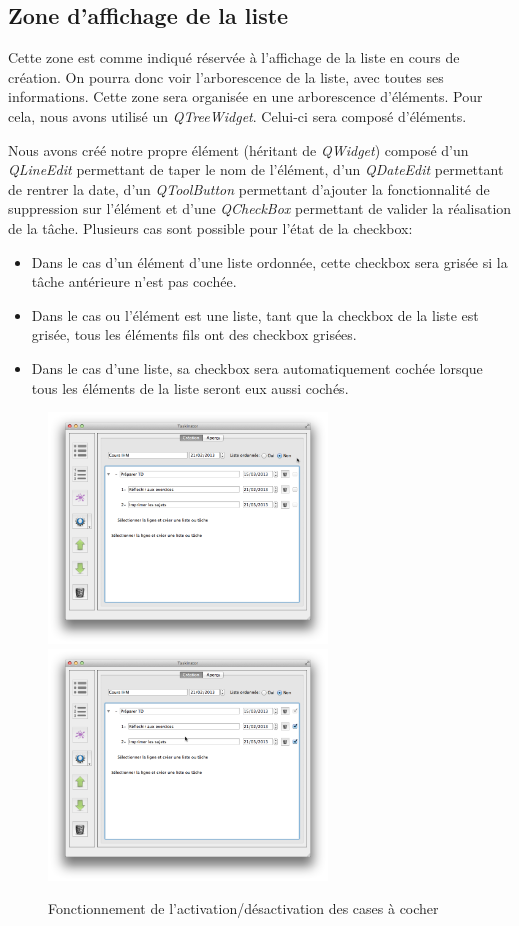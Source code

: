 \documentclass[a4paper,10pt]{article}
\begin{document}
\subsection{Zone d'affichage de la liste}
Cette zone est comme indiqué réservée à l'affichage de la liste en cours de création. On pourra donc voir l'arborescence de la liste, avec toutes ses informations.
Cette zone sera organisée en une arborescence d'éléments. Pour cela, nous avons utilisé un \textit{QTreeWidget}. Celui-ci sera composé d'éléments.

Nous avons créé notre propre élément (héritant de \textit{QWidget}) composé d'un \textit{QLineEdit} permettant de taper le nom de l'élément, d'un \textit{QDateEdit} permettant de rentrer la date, d'un \textit{QToolButton} permettant d'ajouter la fonctionnalité de suppression sur l'élément et d'une \textit{QCheckBox} permettant de valider la réalisation de la tâche.
Plusieurs cas sont possible pour l'état de la checkbox:
\begin{itemize}
\item Dans le cas d'un élément d'une liste ordonnée, cette checkbox sera grisée si la tâche antérieure n'est pas cochée.
\item Dans le cas ou l'élément est une liste, tant que la checkbox de la liste est grisée, tous les éléments fils ont des checkbox grisées.
\item Dans le cas d'une liste, sa checkbox sera automatiquement cochée lorsque tous les éléments de la liste seront eux aussi cochés.
\end{itemize}
\begin{figure}[H]
    \center
    \includegraphics[width=7.4cm]{Images/caseDesactive.png}
    \includegraphics[width=7.4cm]{Images/checkboxListe.png}
    \caption{Fonctionnement de l'activation/désactivation des cases à cocher}
\end{figure}
\end{document}
